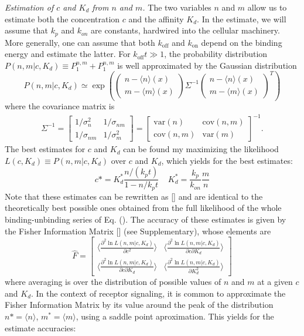 \documentclass[prl,showpacs]{revtex4}
\begin{document}
\emph{Estimation of $c$ and $K_d$ from $n$ and $m$.}
The two variables $n$ and $m$ allow us to estimate both the concentration $c$ and the affinity $K_d$. In the estimate, we will assume that $k_p$ and $k_{on}$ are constants, hardwired into the cellular machinery. More generally, one can assume that both $k_{\text{off}}$ and $k_{\text{on}}$ depend on the binding energy and estimate the latter. For $k_{\text{off}}t\gg 1$, the probability distribution $P(n,m|c,K_d)\equiv P_1^{n,m}+P_1^{n,m}$ is well approximated by the Gaussian distribution
$$
P(n,m|c,K_d)\simeq \exp(\begin{pmatrix} n-\langle n\rangle(x) \\ m-\langle m\rangle(x) \end{pmatrix} \Sigma^{-1} \begin{pmatrix} n-\langle n\rangle(x) \\ m-\langle m\rangle(x) \end{pmatrix}^{T})
$$
where the covariance matrix is
\begin{eqnarray}
\Sigma^{-1} = \begin{bmatrix}1/\sigma^2_n &1/\sigma_{nm}\\1/\sigma_{nm}& 1/\sigma^2_m\end{bmatrix}=\begin{bmatrix}\text{var}(n) &\text{cov}(n,m)\\\text{cov}(n,m)& \text{var}(m)\end{bmatrix}^{-1}.
\end{eqnarray}
The best estimates for $c$ and $K_d$ can be found my maximizing the likelihood $L(c,K_d)\equiv P(n,m|c,K_d)$ over $c$ and $K_d$, which yields for the best estimates:
%
\begin{equation}
c*=K_d^*\frac{n/(k_pt)}{1-n/k_pt}\;\;\;\; K_d^*=\frac{k_p}{k_{on}}\frac{m}{n}
\end{equation}
%
Note that these estimates can be rewritten as [] and are identical to the theoretically best possible ones obtained from the full likelihood of the whole binding-unbinding series of Eq. ().
The accuracy of these estimates is given by the Fisher Information Matrix [] (see Supplementary), whose elements are
\begin{equation}
\hat{F}=\begin{bmatrix}
    \langle \frac{\partial ^2\ln L(n,m|c,K_d)}{\partial c^2}\rangle & \langle \frac{\partial ^2\ln L(n,m|c,K_d)}{\partial c\partial K_d}\rangle\\
    \langle \frac{\partial ^2\ln L(n,m|c,K_d)}{\partial c\partial K_d}\rangle & \langle \frac{\partial ^2\ln L(n,m|c,K_d)}{\partial K_d^2}\rangle
    \end{bmatrix}
\end{equation}
where averaging is over the distribution of possible values of $n$ and $m$ at a given $c$ and $K_d$. In the context of receptor signaling, it is common to approximate the Fisher Information Matrix by its value around the peak of the distribution $n*=\langle n\rangle$, $m^*=\langle m\rangle$, using a saddle point aproximation. This yields for the estimate accuracies:
\end{document}
